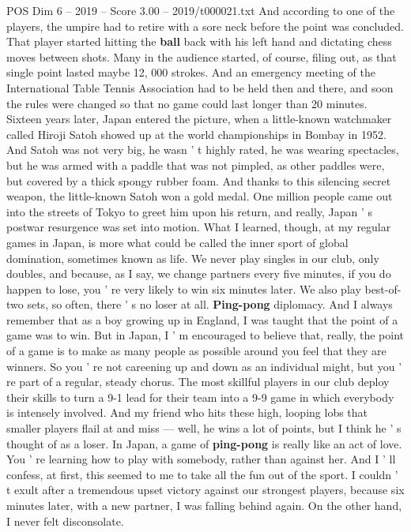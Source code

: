 \begin{textsample}{POS Dim 6 – 2019 – Score 3.00 – 2019/t000021.txt}
And according to one of the players, the umpire had to retire with a sore neck before the point was concluded.
That player started hitting the \textbf{ball} back with his left hand and dictating chess moves between shots.
Many in the audience started, of course, filing out, as that single point lasted maybe 12, 000 strokes.
And an emergency meeting of the International Table Tennis Association had to be held then and there, and soon the rules were changed so that no game could last longer than 20 minutes.
Sixteen years later, Japan entered the picture, when a little-known watchmaker called Hiroji Satoh showed up at the world championships in Bombay in 1952.
And Satoh was not very big, he wasn ' t highly rated, he was wearing spectacles, but he was armed with a paddle that was not pimpled, as other paddles were, but covered by a thick spongy rubber foam.
And thanks to this silencing secret weapon, the little-known Satoh won a gold medal.
One million people came out into the streets of Tokyo to greet him upon his return, and really, Japan ' s postwar resurgence was set into motion.
What I learned, though, at my regular games in Japan, is more what could be called the inner sport of global domination, sometimes known as life.
We never play singles in our club, only doubles, and because, as I say, we change partners every five minutes, if you do happen to lose, you ' re very likely to win six minutes later.
We also play best-of-two sets, so often, there ' s no loser at all. \textbf{Ping-pong} diplomacy.
And I always remember that as a boy growing up in England, I was taught that the point of a game was to win.
But in Japan, I ' m encouraged to believe that, really, the point of a game is to make as many people as possible around you feel that they are winners.
So you ' re not careening up and down as an individual might, but you ' re part of a regular, steady chorus.
The most skillful players in our club deploy their skills to turn a 9-1 lead for their team into a 9-9 game in which everybody is intensely involved.
And my friend who hits these high, looping lobs that smaller players flail at and miss — well, he wins a lot of points, but I think he ' s thought of as a loser.
In Japan, a game of \textbf{ping-pong} is really like an act of love.
You ' re learning how to play with somebody, rather than against her.
And I ' ll confess, at first, this seemed to me to take all the fun out of the sport.
I couldn ' t exult after a tremendous upset victory against our strongest players, because six minutes later, with a new partner, I was falling behind again.
On the other hand, I never felt disconsolate.

\end{textsample}
